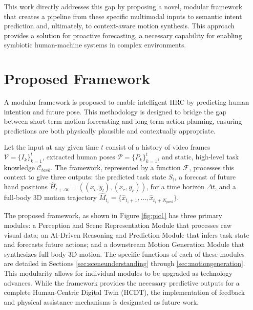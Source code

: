 \documentclass[biomimetics,article,submit,pdftex,moreauthors]{Definitions/mdpi}
\begin{document}
This work directly addresses this gap by proposing a novel, modular framework that creates a pipeline from these specific multimodal inputs to semantic intent prediction and, ultimately, to context-aware motion synthesis. This approach provides a solution for proactive forecasting, a necessary capability for enabling symbiotic human-machine systems in complex environments.

\section{Proposed Framework}
\label{sec:methodology}

A modular framework is proposed to enable intelligent HRC by predicting human intention and future pose. This methodology is designed to bridge the gap between short-term motion forecasting and long-term action planning, ensuring predictions are both physically plausible and contextually appropriate.

Let the input at any given time $t$ consist of a history of video frames $\mathcal{V} = \{I_k\}_{k=1}^t$, extracted human poses $\mathcal{P} = \{P_k\}_{k=1}^t$, and static, high-level task knowledge $\mathcal{C}_{task}$. The framework, represented by a function $\mathcal{F}$, processes this context to give three outputs: the predicted task state $S_t$, a forecast of future hand positions $\hat{H}_{t+\Delta t} = ( (x_l, y_l), (x_r, y_r) )$, for a time horizon $\Delta t$, and a full-body 3D motion trajectory $\hat{M}_{t_i} = \{\hat{x}_{t_i+1}, \ldots, \hat{x}_{t_i+N_{\text{pred}}}\}$.

The proposed framework, as shown in Figure \ref{fig:pic1} has three primary modules: a Perception and Scene Representation Module that processes raw visual data; an AI-Driven Reasoning and Prediction Module that infers task state and forecasts future actions; and a downstream Motion Generation Module that synthesizes full-body 3D motion. The specific functions of each of these modules are detailed in Sections \ref{sec:sceneunderstanding} through \ref{sec:motiongeneration}. This modularity allows for individual modules to be upgraded as technology advances. While the framework provides the necessary predictive outputs for a complete Human-Centric Digital Twin (HCDT), the implementation of feedback and physical assistance mechanisms is designated as future work.
\end{document}

